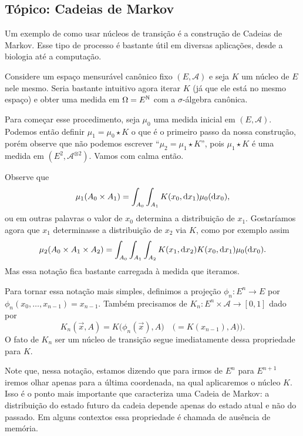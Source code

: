\begin{topics}

\section{Tópico: Cadeias de Markov}
\label{s:cadeias_Markov}

Um exemplo de como usar núcleos de transição é a construção de Cadeias de Markov.
Esse tipo de processo é bastante útil em diversas aplicações, desde a biologia até a computação.

Considere um espaço mensurável canônico fixo $(E, \mathcal{A})$ e seja $K$ um núcleo de $E$ nele mesmo.
Seria bastante intuitivo agora iterar $K$ (já que ele está no mesmo espaço) 
e obter uma medida em $\Omega =E^{{\mathbb N}}$ com a $\sigma$-álgebra canônica.

Para começar esse procedimento, seja $\mu_0$ uma medida inicial em $(E, \mathcal{A})$.
Podemos então definir $\mu_1 = \mu_0 \star K$ o que é 
o primeiro passo da nossa construção, porém observe que não podemos escrever 
``$\mu_2 = \mu_1 \star K$'', pois $\mu_1 \star K$ é uma medida em $(E^2, \mathcal{A}^{\otimes 2})$.
Vamos com calma então.

Observe que
\begin{equation}
  \mu_1(A_0 \times A_1) = \int_{A_0} \int_{A_1} K(x_0, \mathop{}\!\mathrm{d} x_1) \mu_0(\mathop{}\!\mathrm{d} x_0),
\end{equation}
ou em outras palavras o valor de $x_0$ determina a distribuição de $x_1$.
Gostaríamos agora que $x_1$ determinasse a distribuição de $x_2$ via $K$, como por exemplo assim
\begin{equation}
  \mu_2(A_0 \times A_1 \times A_2) = \int_{A_0} \int_{A_1} \int_{A_2} K(x_1, \mathop{}\!\mathrm{d} x_2) K(x_0, \mathop{}\!\mathrm{d} x_1) \mu_0 (\mathop{}\!\mathrm{d} x_0).
\end{equation}
Mas essa notação fica bastante carregada à medida que iteramos.

Para tornar essa notação mais simples, definimos a projeção $\phi_n:E^n \to E$ por $\phi_n(x_0, \dots, x_{n-1}) = x_{n-1}$.
Também precisamos de $K_n: E^n \times \mathcal{A} \to [0,1]$ dado por
\begin{equation}
  K_n(\vec{x},A) = K\big(\phi_n(\vec{x}), A\big) \quad \big(= K(x_{n-1}),A) \big).
\end{equation}
O fato de $K_n$ ser um núcleo de transição segue imediatamente dessa propriedade para $K$.

Note que, nessa notação, estamos dizendo que para irmos de $E^n$ para $E^{n+1}$ iremos olhar apenas para a última coordenada, na qual aplicaremos o núcleo $K$.
Isso é o ponto mais importante que caracteriza uma Cadeia de Markov: a distribuição do estado futuro da cadeia depende apenas do estado atual e não do passado.
Em alguns contextos essa propriedade é chamada de ausência de memória.


\end{topics}
